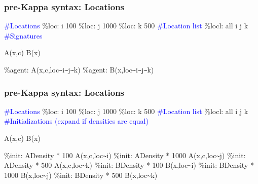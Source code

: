 \documentclass[xcolor=dvipsnames]{beamer}
\def\int{\hbox{\texttt{\~}}}
\begin{document}
\begin{frame}
  \frametitle{pre-Kappa syntax: Locations}
  \begin{flushleft}
    \textcolor{blue}{\#Locations} \newline
    \%loc: i 100 \newline
    \%loc: j 1000 \newline
    \%loc: k 500 \newline \pause
    \textcolor{blue}{\#Location list} \newline
    \%locl: all i j k \newline \pause
    \textcolor{blue}{\#Signatures}
    \item {} A(x,c) \newline
     B(x) \pause
    \item {} \newline
    \%agent: A(x,c,loc\int i\int j\int k) \newline
    \%agent: B(x,loc\int i\int j\int k) \newline
  \end{flushleft}
\end{frame}

\begin{frame}
  \frametitle{pre-Kappa syntax: Locations}
  \begin{flushleft} {\small
    \textcolor{blue}{\#Locations} \newline
    \%loc: i 100 \newline
    \%loc: j 1000 \newline
    \%loc: k 500 \newline
    \textcolor{blue}{\#Location list} \newline
    \%locl: all i j k \newline
    \textcolor{blue}{\#Initializations (expand if densities are equal)}
    \item {} A(x,c) \newline
     B(x) \pause
    \item {} \newline
    \%init: ADensity * 100 A(x,c,loc\int i) \newline
    \%init: ADensity * 1000 A(x,c,loc\int j) \newline
    \%init: ADensity * 500 A(x,c,loc\int k) \newline
    \%init: BDensity * 100 B(x,loc\int i) \newline
    \%init: BDensity * 1000 B(x,loc\int j) \newline
    \%init: BDensity * 500 B(x,loc\int k) \newline }
  \end{flushleft}
\end{frame}
\end{document}
